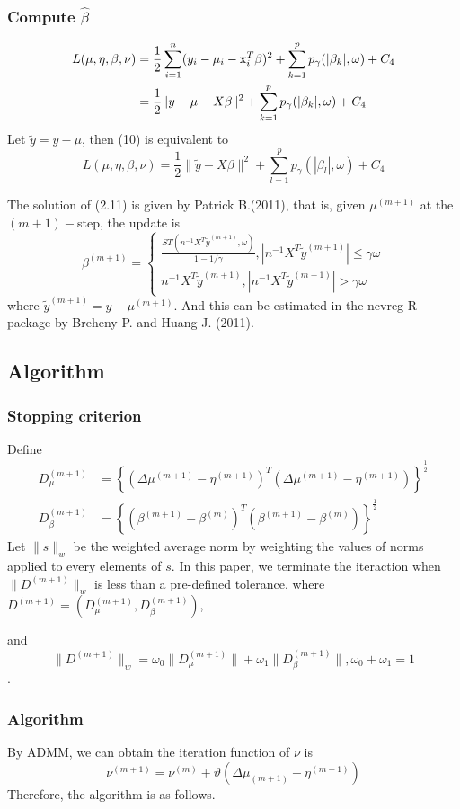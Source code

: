 \documentclass[cjk,10pt]{beamer}
\begin{document}
\begin{CJK*}{GBK}{song}
\begin{frame}
\frametitle{Compute $\hat{\beta}$}
\begin{align*} L(\mu,\eta,\beta,\nu)&=\frac{1}{2}\sum_{i=1}^n(y_i-\mu_i-{\rm x}_i^T\beta)^2+\sum_{k=1}^p p_{\gamma}(|\beta_k|,\omega)+C_4\\
&=\frac{1}{2}\|y-\mu-X\beta\|^2+\sum_{k=1}^p p_{\gamma}(|\beta_k|,\omega)+C_4
\end{align*}
Let $\tilde{y}=y-\mu$, then (10) is equivalent to
$$L(\mu,\eta,\beta,\nu)=\frac{1}{2}\|\tilde{y}-X\beta\|^2+\sum_{l=1}^pp_{\gamma}(|\beta_l|,\omega)+C_4$$
\end{frame}

\begin{frame}
The solution of (2.11) is given by Patrick B.(2011), that is, given $\mu^{(m+1)}$ at the $(m+1)-$step, the update is
$$\beta^{(m+1)}=\begin{cases}\frac{ST(n^{-1}X^T\tilde{y}^{(m+1)},\omega)}{1-1/\gamma},|n^{-1}X^T\tilde{y}^{(m+1)}|\le\gamma\omega\\ n^{-1}X^T\tilde{y}^{(m+1)},|n^{-1}X^T\tilde{y}^{(m+1)}|>\gamma\omega\end{cases}$$
where $\tilde{y}^{(m+1)}=y-\mu^{(m+1)}$. And this can be estimated in the ncvreg R-package by Breheny P. and Huang J. (2011).
\end{frame}
\subsection{Algorithm}
\begin{frame}
\frametitle{Stopping criterion}
Define
\begin{align*}D^{(m+1)}_{\mu} &= \left\{(\Delta\mu^{(m+1)}-\eta^{(m+1)})^T(\Delta\mu^{(m+1)}-\eta^{(m+1)})\right\}^{\frac{1}{2}}\\
D_{\beta}^{(m+1)}&=\left\{ (\beta^{(m+1)}-\beta^{(m)})^T(\beta^{(m+1)}-\beta^{(m)})\right\}^{\frac{1}{2}}
\end{align*}
Let $\|s\|_w$ be the weighted average norm by weighting the values of norms applied to every elements of $s$. In this paper, we terminate the iteraction when $\|D^{(m+1)}\|_w$ is less than a pre-defined tolerance, where $D^{(m+1)}=(D_{\mu}^{(m+1)},D_{\beta}^{(m+1)})$,

and
 $$\|D^{(m+1)}\|_w=\omega_0\|D_{\mu}^{(m+1)}\|+\omega_1\|D_{\beta}^{(m+1)}\|, \omega_0+\omega_1=1$$.
\end{frame}

\begin{frame}
\frametitle{Algorithm}
By ADMM, we can obtain the iteration function of $\nu$ is
$$\nu^{(m+1)}=\nu^{(m)}+\vartheta(\Delta\mu_{(m+1)}-\eta^{(m+1)})$$
Therefore, the algorithm is as follows.



\end{frame}
\end{CJK*}
\end{document}
